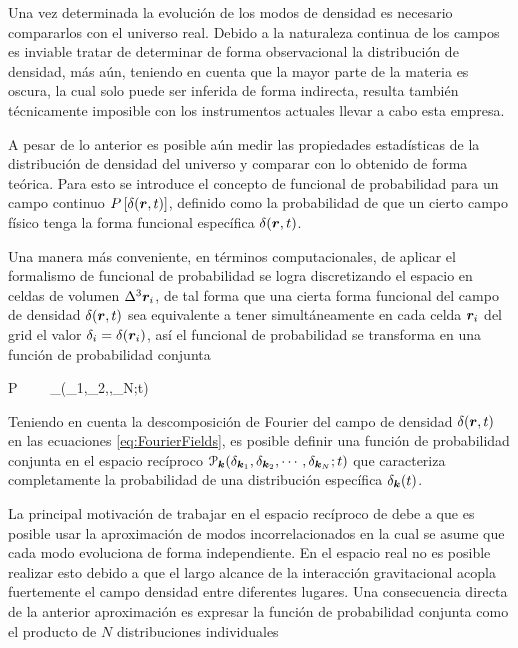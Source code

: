 Una vez determinada la evolución de los modos de densidad es necesario 
compararlos con el universo real. Debido a la naturaleza continua de 
los campos es inviable tratar de determinar de forma ob\-servacional la 
distribución de densidad, más aún, teniendo en cuenta que la mayor parte de 
la materia es oscura, la cual solo puede ser inferida de forma indirecta,
resulta también técnicamente imposible con los instrumentos actuales llevar 
a cabo esta empresa.


A pesar de lo anterior es posible aún medir las propiedades estadísticas
de la distribución de densidad del universo y comparar con lo obtenido de
forma teórica. Para esto se introduce el concepto de funcional de 
probabilidad para un campo continuo $P\left[  \delta(\boldsymbol{ r },t)  \right]$, definido 
como la probabilidad de que un cierto campo físico tenga la forma funcional 
específica $\delta(\boldsymbol{ r },t)$.


Una manera más conveniente, en términos computacionales, de aplicar el 
formalismo de funcional de probabilidad se logra discretizando el espacio 
en celdas de volumen $\Delta^3 \boldsymbol{ r }_i$, de tal forma que una cierta 
forma funcional del campo de densidad $\delta(\boldsymbol{ r },t)$ sea equivalente a 
tener simultáneamente en cada celda $\boldsymbol{ r }_i$ del grid el valor 
$\delta_i = \delta(\boldsymbol{ r }_i)$, así el funcional de probabilidad se 
transforma en una función de probabilidad conjunta


{ P \ \ \longrightarrow \ \ 
_{}(\delta_1,\delta_2,\cdots,\delta_N;t)  }


Teniendo en cuenta la descomposición de Fourier del campo de densidad 
$\delta(\boldsymbol{ r },t)$ en las ecuaciones \ref{eq:FourierFields}, es posible 
definir una función de probabilidad conjunta en el espacio recíproco 
$\mathcal{P}_{\boldsymbol{ k }}(\delta_{\boldsymbol{ k }_1},\delta_{\boldsymbol{ k }_2}, \cdots,
\delta_{\boldsymbol{ k }_N};t)$ que caracteriza completamente la probabilidad de 
una distribución específica $\delta_{\boldsymbol{ k }}(t)$.


La principal motivación de trabajar en el espacio recíproco de debe a que
es posible usar la aproximación de modos incorrelacionados en la cual se
asume que cada modo evoluciona de forma independiente. En el espacio real 
no es posible realizar esto debido a que el largo alcance de la interacción
gravitacional acopla fuertemente el campo densidad entre diferentes 
lugares. Una consecuencia directa de la anterior aproximación es expresar 
la función de probabilidad conjunta como el producto de $N$ distribuciones
individuales \cite{padmanabhan1995}


